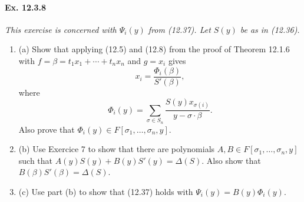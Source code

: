 \documentclass[11pt,a4paper]{article}
\newcommand{\be} {\begin{enumerate}}
\newcommand{\ee} {\end{enumerate}}
\begin{document}
\paragraph{Ex. 12.3.8}

{\it This exercise is concerned with $\Psi_i(y)$ from (12.37). Let $S(y)$ be as in (12.36).
\be
\item[(a)] Show that applying (12.5) and (12.8) from the proof of Theorem 12.1.6 with $f = \beta = t_1x_1+\cdots + t_nx_n$ and $g = x_i$ gives
$$x_i = \frac{\Phi_i(\beta)}{S'(\beta)},$$
where
$$\Phi_i(y) = \sum_{\sigma \in S_n} \frac{S(y) x_{\sigma(i)}}{y - \sigma \cdot \beta}.$$
Also prove that $\Phi_i(y) \in F[\sigma_1,\ldots,\sigma_n,y]$.

\item[(b)] Use Exercice 7 to show that there are polynomials $A,B \in F[\sigma_1,\ldots,\sigma_n,y]$ such that $A(y)S(y) + B(y) S'(y) = \Delta(S)$. Also show that $B(\beta) S'(\beta) = \Delta(S)$.

\item[(c)] Use part (b) to show that (12.37) holds with $\Psi_i(y) = B(y) \Phi_i(y)$.
\ee
}
\end{document}
